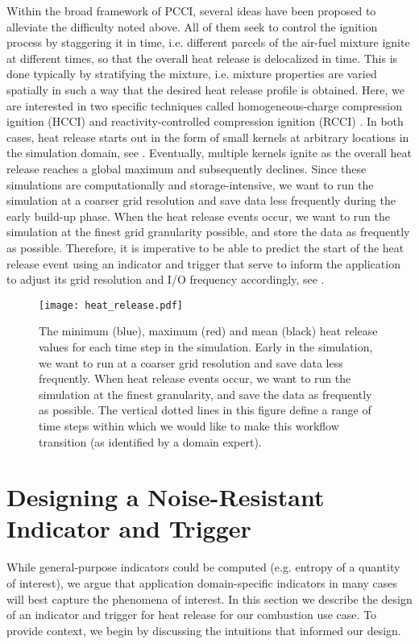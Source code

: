 \documentclass[final]{siamltex}
\begin{document}
Within the broad framework of PCCI, several ideas have been
proposed to alleviate the difficulty noted above. All of them seek to
control the ignition process by staggering it in time, i.e. different
parcels of the air-fuel mixture ignite at different times, so that the
overall heat release is delocalized in time. This is done typically by
stratifying the mixture, i.e. mixture properties are varied  spatially in
such a way that the desired heat release profile is obtained. Here, we are
interested in two specific techniques called homogeneous-charge compression
ignition (HCCI) \cite{bhagatwala1} and reactivity-controlled compression
ignition (RCCI) \cite{kokjohn,bhagatwala2}. In both cases, heat release
starts out in the form of small kernels at arbitrary locations in the
simulation domain, see . Eventually, multiple kernels 
ignite as the overall heat release reaches a global maximum and subsequently 
declines. Since these simulations are computationally and storage-intensive, 
we want to run the simulation at a coarser grid resolution and save data less 
frequently during the early build-up phase.  When the heat release events 
occur,  we want to run the simulation at the finest grid granularity possible, 
and store the data as frequently as possible.  Therefore, it is imperative to 
be able to predict the start of the heat release event using an indicator and 
trigger that serve to inform the application to adjust its grid resolution and 
I/O frequency accordingly, see . \\

\begin{figure}[H]
\centering
\texttt{[image: heat\_release.pdf]}
\caption{\label{fig:heat_release} 
    The minimum (blue), maximum (red) and mean (black) heat release values
  for each time step in the simulation. Early in the simulation,
  we want to run at a coarser grid resolution and save data less frequently.
  When heat release events occur, we want to run the simulation at the finest
  granularity, and save the data as frequently as possible.  The vertical dotted lines
  in this figure define a range of time steps within which we would like to make
  this workflow transition (as identified by a domain expert).
}
\end{figure}

\section{Designing a Noise-Resistant Indicator and Trigger} 
\label{sec:indicator_trigger}
While general-purpose indicators could be computed (e.g. entropy of a quantity
of interest), we argue that application domain-specific indicators in many
cases will best capture the phenomena of interest.  In
this section we describe the design of an indicator and trigger for heat
release for our combustion use case.  
To provide context, we begin by discussing the intuitions that informed our
design.
\end{document}
